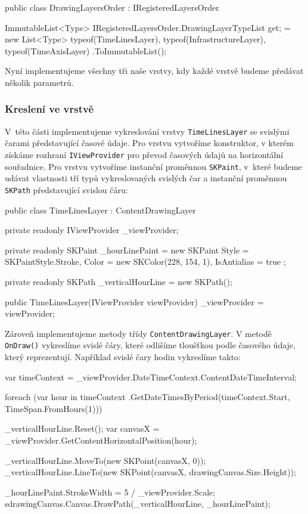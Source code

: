 \begin{csharpcode}
public class DrawingLayersOrder : IRegisteredLayersOrder {

	ImmutableList<Type> IRegisteredLayersOrder.DrawingLayerTypeList { get; }
	= new List<Type> {
          typeof(TimeLinesLayer),
          typeof(InfrastructureLayer),
          typeof(TimeAxisLayer)
	}.ToImmutableList();
}
\end{csharpcode}

Nyní implementujeme všechny tři naše vrstvy, kdy každé vrstvě budeme předávat několik parametrů.

\subsubsection*{Kreslení ve vrstvě}
\label{kap5:kresleni_ve_vrstve}
V~této části implementujeme vykreslování vrstvy \texttt{TimeLinesLayer} se svislými čarami představující časové údaje. Pro vrstvu vytvoříme konstruktor, v kterém získáme rozhraní \texttt{IViewProvider} pro převod časových údajů na horizontální souřadnice. Pro vrstvu vytvoříme instanční proměnnou \texttt{SKPaint}, v~které budeme udávat vlastnosti tří typů vykreslovaných svislých čar a instanční proměnnou \texttt{SKPath} představující svislou čáru:

\begin{csharpcode}
public class TimeLinesLayer : ContentDrawingLayer {
  
  private readonly IViewProvider _viewProvider;

  private readonly SKPaint _hourLinePaint = new SKPaint {
	Style = SKPaintStyle.Stroke,
	Color = new SKColor(228, 154, 1),
	IsAntialias = true
  };
        
  private readonly SKPath _verticalHourLine = new SKPath();

  public TimeLinesLayer(IViewProvider viewProvider) {
	_viewProvider = viewProvider;
  }
}
\end{csharpcode}

Zároveň implementujeme metody třídy \texttt{ContentDrawingLayer}. V metodě \linebreak \texttt{OnDraw()} vykreslíme svislé čáry, které odlišíme tloušťkou podle časového údaje, který reprezentují. Například svislé čary hodin vykreslíme takto:

\begin{csharpcode}
var timeContext = _viewProvider.DateTimeContext.ContentDateTimeInterval;

  foreach (var hour in timeContext
  	.GetDateTimesByPeriod(timeContext.Start, TimeSpan.FromHours(1))) {

	_verticalHourLine.Reset();
	var canvasX = _viewProvider.GetContentHorizontalPosition(hour);

	_verticalHourLine.MoveTo(new SKPoint(canvasX, 0));
	_verticalHourLine.LineTo(new SKPoint(canvasX, drawingCanvas.Size.Height));

    _hourLinePaint.StrokeWidth = 5 / _viewProvider.Scale;
	sdrawingCanvas.Canvas.DrawPath(_verticalHourLine, _hourLinePaint);
}
\end{csharpcode}

